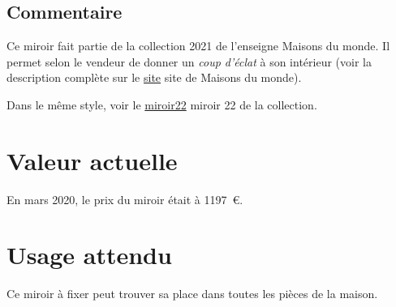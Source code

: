       \subsection* {Commentaire}
       
    
Ce miroir fait partie de la collection 2021 de l’enseigne Maisons du monde. Il
                permet selon le vendeur de donner un  
      {\em coup d’éclat }  à son intérieur (voir la
                description complète sur le  
    \href{http://www.maisonsdumonde.com/FR/fr/p/miroir-rond-or-etoile-d120-M20020841.htm}{site}
  site de Maisons du monde). 
    
 
    
Dans le même style, voir le 
    \href{miroir22.xml}{miroir22}
      miroir 22 de la collection. 
    

      \section* {Valeur actuelle} En mars 2020, le prix du miroir était à 1197 €.
      \section* {Usage attendu}  
    
Ce miroir à fixer peut trouver sa place dans toutes les pièces de la maison. 
    

    
  